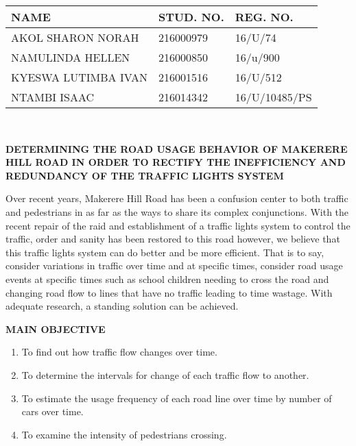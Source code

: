 \documentclass[11pt,a4paper,final]{report}
\begin{document}

\noindent
\begin{tabular}{|p{2.0in}|p{1.0in}|p{1.3in}|} \hline 
\textbf{NAME} & \textbf{STUD. NO.} & \textbf{REG. NO.} \\ \hline 
AKOL SHARON NORAH & 216000979 & 16/U/74 \\ \hline 
NAMULINDA HELLEN & 216000850 & 16/u/900  \\ \hline 
KYESWA LUTIMBA IVAN & 216001516 & 16/U/512  \\ \hline 
NTAMBI ISAAC & 216014342 & 16/U/10485/PS  \\ \hline 
\end{tabular} \\

\textbf{}

\noindent \textbf{DETERMINING THE ROAD USAGE BEHAVIOR OF MAKERERE HILL ROAD IN ORDER TO RECTIFY THE INEFFICIENCY AND REDUNDANCY OF THE TRAFFIC LIGHTS SYSTEM} \\

\noindent 

\noindent Over recent years, Makerere Hill Road has been a confusion center to both traffic and pedestrians in as far as the ways to share its complex conjunctions. With the recent repair of the raid and establishment of a traffic lights system to control the traffic, order and sanity has been restored to this road however, we believe that this traffic lights system can do better and be more efficient. That is to say, consider variations in traffic over time and at specific times, consider road usage events at specific times such as school children needing to cross the road and changing road flow to lines that have no traffic leading to time wastage. With adequate research, a standing solution can be achieved. \\

\noindent 

\noindent \textbf{MAIN OBJECTIVE}

\begin{enumerate}
\item \textbf{ }To find out how traffic flow changes over time.

\item  To determine the intervals for change of each traffic flow to another.

\item  To estimate the usage frequency of each road line over time by number of cars over time.

\item  To examine the intensity of pedestrians crossing.
\end{enumerate}
\end{document}
